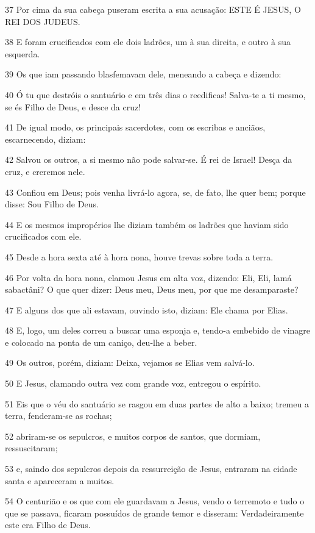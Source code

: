 \par 37 Por cima da sua cabeça puseram escrita a sua acusação: ESTE É JESUS, O REI DOS JUDEUS.
\par 38 E foram crucificados com ele dois ladrões, um à sua direita, e outro à sua esquerda.
\par 39 Os que iam passando blasfemavam dele, meneando a cabeça e dizendo:
\par 40 Ó tu que destróis o santuário e em três dias o reedificas! Salva-te a ti mesmo, se és Filho de Deus, e desce da cruz!
\par 41 De igual modo, os principais sacerdotes, com os escribas e anciãos, escarnecendo, diziam:
\par 42 Salvou os outros, a si mesmo não pode salvar-se. É rei de Israel! Desça da cruz, e creremos nele.
\par 43 Confiou em Deus; pois venha livrá-lo agora, se, de fato, lhe quer bem; porque disse: Sou Filho de Deus.
\par 44 E os mesmos impropérios lhe diziam também os ladrões que haviam sido crucificados com ele.
\par 45 Desde a hora sexta até à hora nona, houve trevas sobre toda a terra.
\par 46 Por volta da hora nona, clamou Jesus em alta voz, dizendo: Eli, Eli, lamá sabactâni? O que quer dizer: Deus meu, Deus meu, por que me desamparaste?
\par 47 E alguns dos que ali estavam, ouvindo isto, diziam: Ele chama por Elias.
\par 48 E, logo, um deles correu a buscar uma esponja e, tendo-a embebido de vinagre e colocado na ponta de um caniço, deu-lhe a beber.
\par 49 Os outros, porém, diziam: Deixa, vejamos se Elias vem salvá-lo.
\par 50 E Jesus, clamando outra vez com grande voz, entregou o espírito.
\par 51 Eis que o véu do santuário se rasgou em duas partes de alto a baixo; tremeu a terra, fenderam-se as rochas;
\par 52 abriram-se os sepulcros, e muitos corpos de santos, que dormiam, ressuscitaram;
\par 53 e, saindo dos sepulcros depois da ressurreição de Jesus, entraram na cidade santa e apareceram a muitos.
\par 54 O centurião e os que com ele guardavam a Jesus, vendo o terremoto e tudo o que se passava, ficaram possuídos de grande temor e disseram: Verdadeiramente este era Filho de Deus.
